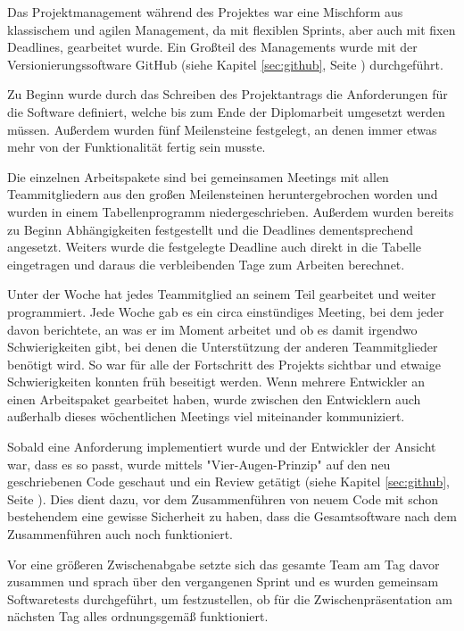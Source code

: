 \label{sec:ProManZELIA}

Das Projektmanagement während des Projektes war eine Mischform aus klassischem und agilen Management, da mit flexiblen Sprints, aber auch mit fixen Deadlines, gearbeitet wurde. Ein Großteil des Managements wurde mit der Versionierungssoftware GitHub (siehe Kapitel \ref{sec:github}, Seite \pageref{sec:github}) durchgeführt.

Zu Beginn wurde durch das Schreiben des Projektantrags die Anforderungen für die Software definiert, welche bis zum Ende der Diplomarbeit umgesetzt werden müssen. Außerdem wurden fünf Meilensteine festgelegt, an denen immer etwas mehr von der Funktionalität fertig sein musste.

Die einzelnen Arbeitspakete sind bei gemeinsamen Meetings mit allen Teammitgliedern aus den großen Meilensteinen heruntergebrochen worden und wurden in einem Tabellenprogramm niedergeschrieben. Außerdem wurden bereits zu Beginn Abhängigkeiten festgestellt und die Deadlines dementsprechend angesetzt. Weiters wurde die festgelegte Deadline auch direkt in die Tabelle eingetragen und daraus die verbleibenden Tage zum Arbeiten berechnet.  

Unter der Woche hat jedes Teammitglied an seinem Teil gearbeitet und weiter programmiert. Jede Woche gab es ein circa einstündiges Meeting, bei dem jeder davon berichtete, an was er im Moment arbeitet und ob es damit irgendwo Schwierigkeiten gibt, bei denen die Unterstützung der anderen Teammitglieder benötigt wird. So war für alle der Fortschritt des Projekts sichtbar und etwaige Schwierigkeiten konnten früh beseitigt werden. Wenn mehrere Entwickler an einen Arbeitspaket gearbeitet haben, wurde zwischen den Entwicklern auch außerhalb dieses wöchentlichen Meetings viel miteinander kommuniziert.

Sobald eine Anforderung implementiert wurde und der Entwickler der Ansicht war, dass es so passt, wurde mittels "Vier-Augen-Prinzip" auf den neu geschriebenen Code geschaut und ein Review getätigt (siehe Kapitel \ref{sec:github}, Seite \pageref{sec:github}). Dies dient dazu, vor dem Zusammenführen von neuem Code mit schon bestehendem eine gewisse Sicherheit zu haben, dass die Gesamtsoftware nach dem Zusammenführen auch noch funktioniert.

Vor eine größeren Zwischenabgabe setzte sich das gesamte Team am Tag davor zusammen und sprach über den vergangenen Sprint und es wurden gemeinsam Softwaretests durchgeführt, um festzustellen, ob für die Zwischenpräsentation am nächsten Tag alles ordnungsgemäß funktioniert. 
